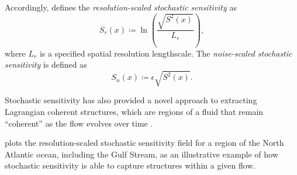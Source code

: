 Accordingly, \citet{Balasuriya_2020_StochasticSensitivityComputable} defines the \emph{resolution-scaled stochastic sensitivity} as
\begin{equation}
	S_r\left(x\right) \coloneqq \ln\left(\frac{\sqrt{S^2(x)}}{L_r}\right),
	\label{eqn:Sr_defn}
\end{equation}
where \(L_r\) is a specified spatial resolution lengthscale.
The \emph{noise-scaled stochastic sensitivity} is defined as
\begin{equation}
	S_n\left(x\right) \coloneqq \epsilon\sqrt{S^2(x)}.
	\label{eqn:Sn_defn}
\end{equation}

Stochastic sensitivity has also provided a novel approach to extracting Lagrangian coherent structures, which are regions of a fluid that remain ``coherent'' as the flow evolves over time \citep{BalasuriyaEtAl_2018_GeneralizedLagrangianCoherent,AllshousePeacock_2015_LagrangianBasedMethods,HadjighasemEtAl_2017_CriticalComparisonLagrangian}.

 plots the resolution-scaled stochastic sensitivity field for a region of the North Atlantic ocean, including the Gulf Stream, as an illustrative example of how stochastic sensitivity is able to capture structures within a given flow.

